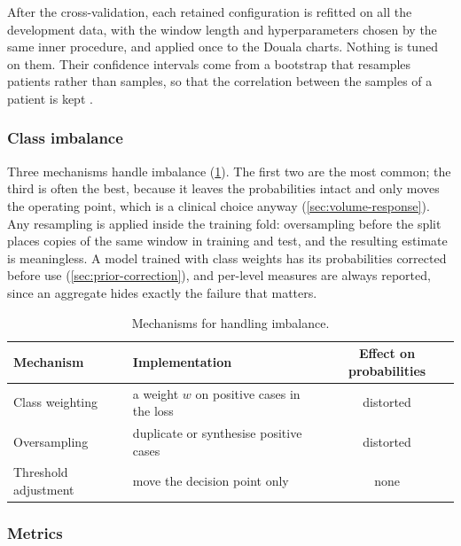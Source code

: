 After the cross-validation, each retained configuration is refitted on all the development data, with the window length and hyperparameters chosen by the same inner procedure, and applied once to the Douala charts. Nothing is tuned on them. Their confidence intervals come from a bootstrap that resamples patients rather than samples, so that the correlation between the samples of a patient is kept \parencite{collins2016}.

\subsubsection{Class imbalance}\label{sec:imbalance-training}

Three mechanisms handle imbalance (\cref{tab:imbalance-mechanisms}). The first two are the most common; the third is often the best, because it leaves the probabilities intact and only moves the operating point, which is a clinical choice anyway (\cref{sec:volume-response}). Any resampling is applied inside the training fold: oversampling before the split places copies of the same window in training and test, and the resulting estimate is meaningless. A model trained with class weights has its probabilities corrected before use (\cref{sec:prior-correction}), and per-level measures are always reported, since an aggregate hides exactly the failure that matters.

\begin{table}[htbp]
\centering\small
\caption{Mechanisms for handling imbalance.}\label{tab:imbalance-mechanisms}
\begin{tabularx}{\textwidth}{@{}>{\raggedright\arraybackslash}p{3.6cm} X c@{}}
\toprule
\textbf{Mechanism} & \textbf{Implementation} & \textbf{Effect on probabilities} \\
\midrule
Class weighting & a weight $w$ on positive cases in the loss & distorted \\
Oversampling & duplicate or synthesise positive cases & distorted \\
Threshold adjustment & move the decision point only & none \\
\bottomrule
\end{tabularx}
\end{table}

\subsubsection{Metrics}\label{sec:metrics}\label{sec:accuracy-trap}\label{sec:positive-class}\label{sec:sens-spec}

